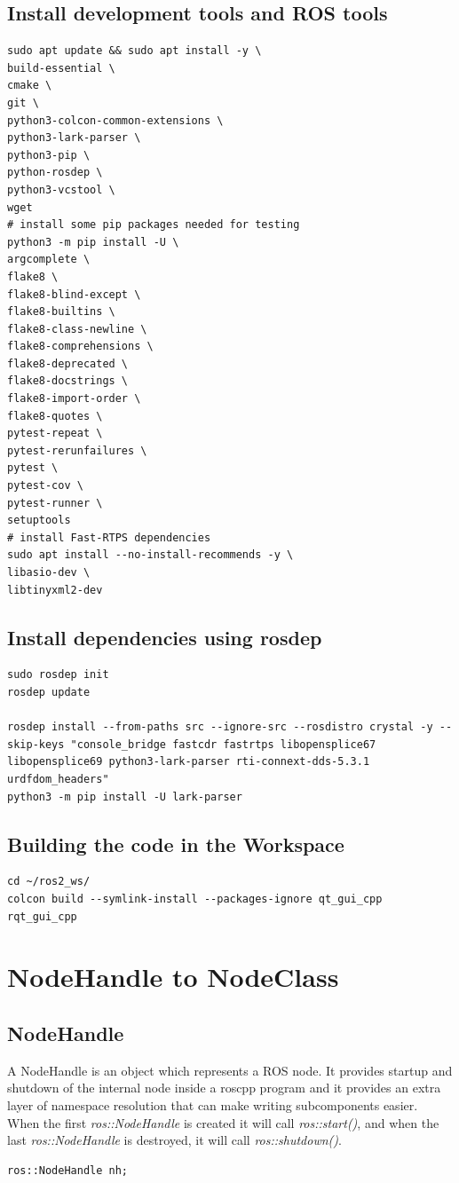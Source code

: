 \documentclass[12pt,a4paper,oneside]{report}
\begin{document}
\section{Install development tools and ROS tools}
\begin{lstlisting}
sudo apt update && sudo apt install -y \
build-essential \
cmake \
git \
python3-colcon-common-extensions \
python3-lark-parser \
python3-pip \
python-rosdep \
python3-vcstool \
wget
# install some pip packages needed for testing
python3 -m pip install -U \
argcomplete \
flake8 \
flake8-blind-except \
flake8-builtins \
flake8-class-newline \
flake8-comprehensions \
flake8-deprecated \
flake8-docstrings \
flake8-import-order \
flake8-quotes \
pytest-repeat \
pytest-rerunfailures \
pytest \
pytest-cov \
pytest-runner \
setuptools
# install Fast-RTPS dependencies
sudo apt install --no-install-recommends -y \
libasio-dev \
libtinyxml2-dev
\end{lstlisting}

\section{Install dependencies using rosdep}
\begin{lstlisting}
sudo rosdep init
rosdep update

rosdep install --from-paths src --ignore-src --rosdistro crystal -y --skip-keys "console_bridge fastcdr fastrtps libopensplice67 libopensplice69 python3-lark-parser rti-connext-dds-5.3.1 urdfdom_headers"
python3 -m pip install -U lark-parser
\end{lstlisting}

\section{Building the code in the Workspace}
\begin{lstlisting}
cd ~/ros2_ws/
colcon build --symlink-install --packages-ignore qt_gui_cpp rqt_gui_cpp
\end{lstlisting}
\chapter{NodeHandle to NodeClass}

\section{NodeHandle}
A NodeHandle is an object which represents a ROS node. It provides startup and shutdown of the internal node inside a roscpp program and it provides an extra layer of namespace resolution that can make writing subcomponents easier.\\
When the first \textit{ros::NodeHandle} is created it will call \textit{ros::start()}, and when the last \textit{ros::NodeHandle} is destroyed, it will call \textit{ros::shutdown()}.
\begin{lstlisting}
ros::NodeHandle nh;
\end{lstlisting}
\end{document}
